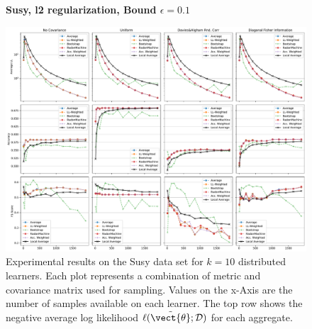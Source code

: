     \begin{landscape}
        \begin{figure}
            \centering
            \textbf{Susy, l2 regularization, Bound $\epsilon=0.1$}\par\medskip
            \includegraphics[height=\dimexpr \textheight - 4\baselineskip\relax]{kapitel/figures/susy_l2_0.1.pdf}
            \caption[Susy plots with l2 regularization and $\epsilon=0.1$]{Experimental results on the Susy data set for $k=10$ distributed learners. Each plot represents a combination of metric and covariance matrix used for sampling. Values on the x-Axis are the number of samples available on each learner. The top row shows the negative average log likelihood $\ell(\tilde{\vect{\theta}}; \mathcal{D})$ for each aggregate.}
            \label{fig:analysis6}
        \end{figure}
    \end{landscape}

